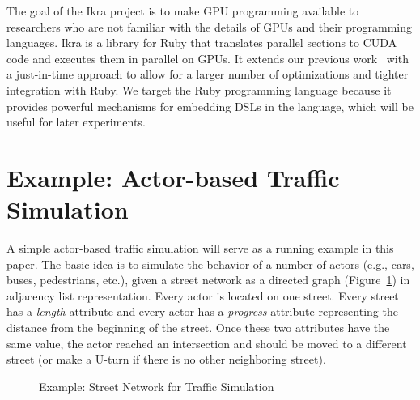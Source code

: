 \documentclass[preprint]{sigplanconf}
\begin{document}
The goal of the Ikra project is to make GPU programming available to researchers who are not familiar with the details of GPUs and their programming languages. Ikra is a library for Ruby that translates parallel sections to CUDA code and executes them in parallel on GPUs. It extends our previous work~\cite{Masuhara:2012:DER:2237887.2237888} with a just-in-time approach to allow for a larger number of optimizations and tighter integration with Ruby. We target the Ruby programming language because it provides powerful mechanisms for embedding DSLs in the language, which will be useful for later experiments.

\section{Example: Actor-based Traffic Simulation}
A simple actor-based traffic simulation will serve as a running example in this paper. The basic idea is to simulate the behavior of a number of actors (e.g., cars, buses, pedestrians, etc.), given a street network as a directed graph (Figure~\ref{fig:running_example}) in adjacency list representation. Every actor is located on one street. Every street has a \emph{length} attribute and every actor has a \emph{progress} attribute representing the distance from the beginning of the street. Once these two attributes have the same value, the actor reached an intersection and should be moved to a different street (or make a U-turn if there is no other neighboring street).

\begin{figure}[!htp]
    \centering
    
    \caption{Example: Street Network for Traffic Simulation}
    \label{fig:running_example}%
\end{figure}
\end{document}
